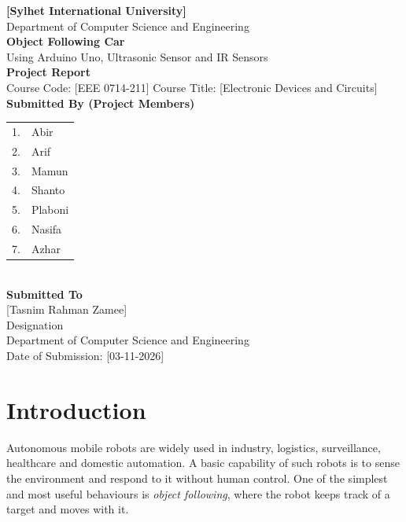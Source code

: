\documentclass[12pt,a4paper]{article}
\begin{document}
\begin{titlepage}
\centering
{\Large \textbf{[Sylhet International University]}}\\[0.3cm]
{\large Department of Computer Science and Engineering}\\[2cm]

{\Huge \textbf{Object Following Car}}\\[0.6cm]
{\large Using Arduino Uno, Ultrasonic Sensor and IR Sensors}\\[1.5cm]

{\large \textbf{Project Report}}\\[0.3cm]
{\large Course Code: [EEE 0714-211] \quad Course Title: [Electronic Devices and Circuits]}\\[1.8cm]

\textbf{\large Submitted By (Project Members)}\\[0.4cm]
\begin{tabular}{rl}
1. & Abir \\
2. & Arif \\
3. & Mamun \\
4. & Shanto \\
5. & Plaboni \\
6. & Nasifa \\
7. & Azhar \\
\end{tabular}\\[0.3cm]

\textbf{\large Submitted To}\\[0.3cm]
[Tasnim Rahman Zamee]\\
Designation\\
Department of Computer Science and Engineering\\[1.5cm]

Date of Submission: [03-11-2026]
\end{titlepage}

\section{Introduction}
Autonomous mobile robots are widely used in industry, logistics, surveillance, healthcare and domestic automation. A basic capability of such robots is to sense the environment and respond to it without human control. One of the simplest and most useful behaviours is \emph{object following}, where the robot keeps track of a target and moves with it.
\end{document}
